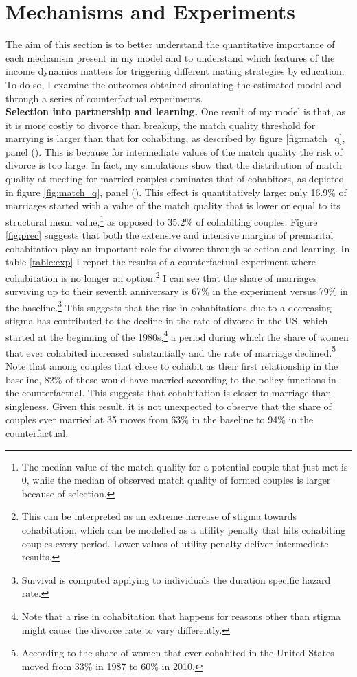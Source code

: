 \documentclass[12pt]{article}
\begin{document}
\section{Mechanisms and Experiments}
The aim of this section is to better understand the quantitative importance of each mechanism present in my model  and to understand which features of the income dynamics matters for triggering different mating strategies by education. To do so, I examine the outcomes obtained simulating the estimated model and through a series of counterfactual experiments.\\
\textbf{Selection into partnership and learning.} One result of my model is that, as it is more costly to divorce than breakup, the match quality threshold for marrying is larger than that for cohabiting, as described by figure \ref{fig:match_q}, panel (). This is because for intermediate values of the match quality the risk of divorce is too large. In fact, my simulations show that the distribution of match quality at meeting for married couples dominates that of cohabitors, as depicted in figure \ref{fig:match_q}, panel (). This effect is quantitatively large: only 16.9\% of marriages started with a value of the match quality that is lower or equal to its structural mean value,\footnote{The median value of the match quality for a potential couple that just met is 0, while the median of observed match quality of formed couples is larger because of selection.} as opposed to 35.2\% of cohabiting couples. Figure \ref{fig:prec} suggests that both the extensive and intensive margins of premarital cohabitation play an important role for divorce through selection and learning. In table \ref{table:exp} I report the results of a counterfactual experiment where cohabitation is no longer an option:\footnote{This can be interpreted as an extreme increase of stigma towards cohabitation, which can be modelled as a utility penalty that hits cohabiting couples every period. Lower values of utility penalty deliver intermediate results.} I can see that the share of marriages surviving up to their seventh anniversary is 67\% in the experiment versus 79\% in the baseline.\footnote{Survival is computed applying to individuals the duration specific hazard rate.} This suggests that the rise in cohabitations due to a decreasing stigma has contributed to the decline in the rate of divorce in the US, which started at the beginning of the 1980s,\footnote{Note that a rise in cohabitation that happens for reasons other than stigma might cause the divorce rate to vary differently.} a period during which the share of women that ever cohabited increased substantially and the rate of marriage declined.\footnote{According to \cite{manning2013} the share of women that ever cohabited in the United States moved from 33\% in 1987 to 60\% in 2010.} Note that among couples that chose to cohabit as their first relationship in the baseline, 82\% of these would have married according to the policy functions in the counterfactual. This suggests that cohabitation is closer to marriage than singleness. Given this result, it is not unexpected to observe that the share of couples ever married at 35 moves from 63\% in the baseline to 94\% in the counterfactual.
\end{document}
